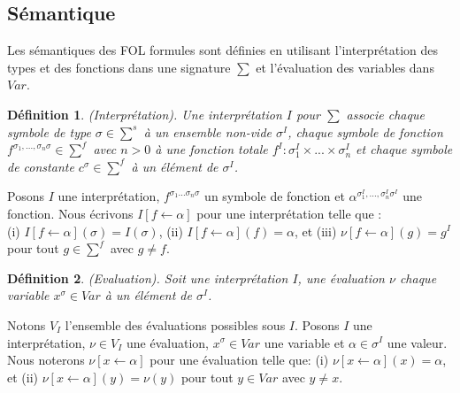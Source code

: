 \documentclass[9pt,openany]{book}
\newtheorem{definition}{D\'efinition}[section]
\begin{document}
	\subsection{S\'emantique}
	Les s\'emantiques des FOL formules sont d\'efinies en utilisant l'interpr\'etation des types et des fonctions dans une signature $\sum$ et l'\'evaluation des variables dans $Var$.
\begin{definition}
(Interpr\'etation). Une interpr\'etation $I$ pour $\sum$ associe chaque symbole de type $\sigma \in \sum^{s}$ \`a un ensemble non-vide $\sigma^{I}$, chaque symbole de fonction $f^{\sigma_{1},...,\sigma_{n}\sigma} \in \sum^{f}$ avec $n > 0$ \`a une fonction totale $f^{I} : \sigma_{1}^{I}\times ... \times \sigma_{n}^{I}$ et chaque symbole de constante $c^{\sigma} \in \sum^{f}$ \`a un \'el\'ement de $\sigma^{I}$.
\end{definition}
	Posons $I$ une interpr\'etation, $f^{\sigma_{1} ...\sigma_{n} \sigma}$ un symbole de fonction et $\alpha^{\sigma_{1}^{I},...,\sigma_{n}^{I}\sigma^{I}}$ une fonction. Nous \'ecrivons $I[f \leftarrow \alpha]$ pour une interpr\'etation telle que : \\(i) $I[f\leftarrow\alpha](\sigma) = I(\sigma)$, (ii) $I[f\leftarrow\alpha](f) = \alpha$, et (iii) $\nu[f\leftarrow\alpha](g) = g^{I}$ pour tout $g \in \sum^{f}$ avec $g\neq f$.
	
\begin{definition}
(Evaluation). Soit une interpr\'etation $I$, une \'evaluation $\nu$ chaque variable $x^{\sigma} \in Var$ \`a un \'el\'ement de $\sigma^{I}$.
\end{definition}
Notons $V_{I}$ l'ensemble des \'evaluations possibles sous $I$.
Posons $I$ une interpr\'etation, $\nu \in V_{I}$ une \'evaluation, $x^{\sigma} \in Var$ une variable et $\alpha \in \sigma^{I}$ une valeur. Nous noterons $\nu[x\leftarrow\alpha]$ pour une \'evaluation telle que: (i) $\nu[x\leftarrow\alpha](x) = \alpha$, et (ii) $\nu[x\leftarrow\alpha](y)=\nu(y)$ pour tout $y\in Var$ avec $y\neq x$.
\end{document}
